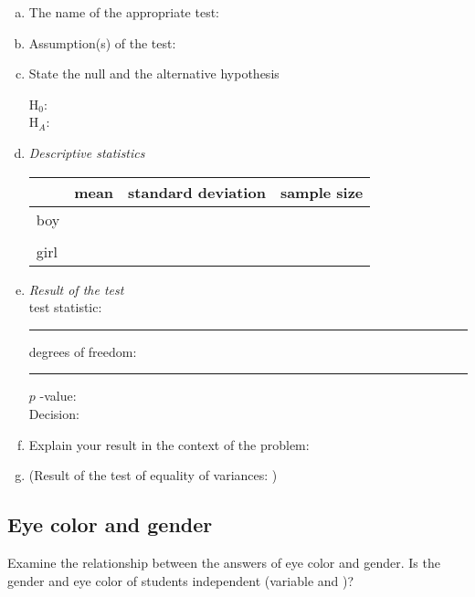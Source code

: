  \begin{enumerate}[a)]
 			\item The name of the appropriate test:	
				\hrulefill 
				
			\item
					Assumption(s) of the test: \hrulefill
				
				\hrulefill
			\item		
			State the null and the alternative hypothesis
			
			H$_0$: 	\hrulefill 	\\
			H$_A$: \hrulefill 	
			\item \emph{Descriptive statistics}
			
			
				\begin{large}
					\begin{center}
						\begin{tabular}{l||l|l|l}
						\toprule
								& mean	& standard deviation & sample size\\
						\midrule
						boy	&&&\\
									&&&\\
						girl	&&&\\
						\bottomrule
						\end{tabular}
					\end{center}						
				\end{large}

			\item \emph{Result of the test}
				\\
				
				test statistic: \rule{30mm}{.4pt}	degrees of freedom:  \rule{30mm}{.4pt}	$p$ -value: \hrulefill
				\\

					Decision: 	\hrulefill
		
			\item Explain your result in the context of the problem:
			
			 \hrulefill		
			 
			 \item (Result of the test of equality of variances: \hrulefill)	
	
\end{enumerate}



\subsection{Eye color and gender}
Examine the relationship between the answers of eye color and gender. Is the gender and eye color of students independent (variable  and )?

